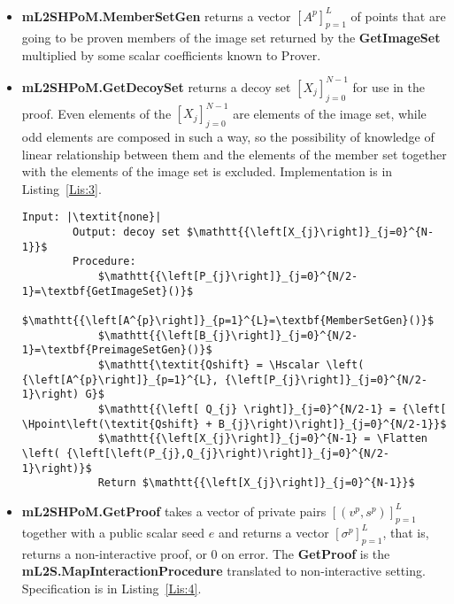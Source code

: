 \documentclass{mathcryptology} %
\newcommand{\Hpoint}{\textbf{H}_{\textbf{point}}}
\newcommand{\Hscalar}{\textbf{H}_{\textbf{scalar}}}
\newcommand{\Flatten}{\textit{Flatten}}
\theoremstyle{title}
\theoremstyle{titleof}
\begin{document}
\begin{itemize}
        \item \textbf{mL2SHPoM.MemberSetGen} returns a vector ${\left[A^{p}\right]}_{p=1}^{L}$ of points that are going to be proven members of the image set returned by the \textbf{GetImageSet} multiplied by some scalar coefficients known to Prover.
        \item \textbf{mL2SHPoM.GetDecoySet} returns a decoy set ${\left[X_{j}\right]}_{j=0}^{N-1}$ for use in the proof. Even elements of the ${\left[X_{j}\right]}_{j=0}^{N-1}$ are elements of the image set, while odd elements are composed in such a way, so the possibility of knowledge of linear relationship between them and the elements of the member set together with the elements of the image set is excluded. Implementation is in Listing~\ref{Lis:3}.

        \begin{mdframed}[backgroundcolor=black!10!white]
        \begin{lstlisting}[caption={\textbf{mL2SHPoM.GetDecoySet} implementation.},label={Lis:3}]
        Input: |\textit{none}|
        Output: decoy set $\mathtt{{\left[X_{j}\right]}_{j=0}^{N-1}}$
        Procedure:
            $\mathtt{{\left[P_{j}\right]}_{j=0}^{N/2-1}=\textbf{GetImageSet}()}$
            $\mathtt{{\left[A^{p}\right]}_{p=1}^{L}=\textbf{MemberSetGen}()}$
            $\mathtt{{\left[B_{j}\right]}_{j=0}^{N/2-1}=\textbf{PreimageSetGen}()}$            
            $\mathtt{\textit{Qshift} = \Hscalar \left( {\left[A^{p}\right]}_{p=1}^{L}, {\left[P_{j}\right]}_{j=0}^{N/2-1}\right) G}$
            $\mathtt{{\left[ Q_{j} \right]}_{j=0}^{N/2-1} = {\left[ \Hpoint\left(\textit{Qshift} + B_{j}\right)\right]}_{j=0}^{N/2-1}}$
            $\mathtt{{\left[X_{j}\right]}_{j=0}^{N-1} = \Flatten \left( {\left[\left(P_{j},Q_{j}\right)\right]}_{j=0}^{N/2-1}\right)}$
            Return $\mathtt{{\left[X_{j}\right]}_{j=0}^{N-1}}$
        \end{lstlisting}
        \end{mdframed}

        \item \textbf{mL2SHPoM.GetProof} takes a vector of private pairs ${\left[\left(v^{p}, s^{p}\right)\right]}_{p=1}^{L}$ together with a public scalar seed $e$ and returns a vector ${\left[\sigma^{p}\right]}_{p=1}^{L}$, that is, returns a non-interactive proof, or $0$ on error. The \textbf{GetProof} is the \textbf{mL2S.MapInteractionProcedure} translated to non-interactive setting. Specification is in Listing~\ref{Lis:4}.


\end{itemize}
\end{document}
